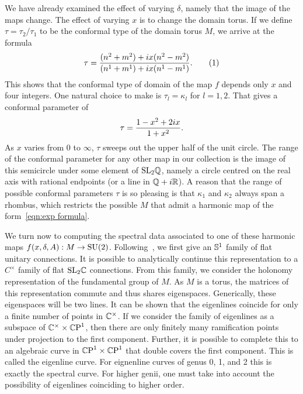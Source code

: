 \documentclass{article}
\begin{document}
We have already examined the effect of varying $\delta$, namely that the image of the maps change. The effect of varying $x$ is to change the domain torus. If we define $\tau = \tau_2/\tau_1$ to be the conformal type of the domain torus $M$, we arrive at the formula
\[
\tau
= \frac{(n^2 + m^2) + \iu x(n^2 - m^2)}
{(n^1+m^1) +\iu x(n^1-m^1)}.
\labelthis{eqn:conformal type}
\]
This shows that the conformal type of domain of the map $f$ depends only $x$ and four integers. One natural choice to make is $\tau_l=\kappa_l$ for $l=1,2$. That gives a conformal parameter of 
\[
\tau = \frac{1-x^2 + 2\iu x}{1+x^2}.
\]
As $x$ varies from $0$ to $\infty$, $\tau$ sweeps out the upper half of the unit circle. The range of the conformal parameter for any other map in our collection is the image of this semicircle under some element of $\SL_2\Q$, namely a circle centred on the real axis with rational endpoints (or a line in $\Q+\iu\R$).
A reason that the range of possible conformal parameters $\tau$ is so pleasing is that $\kappa_1$ and $\kappa_2$ always span a rhombus, which restricts the possible $M$ that admit a harmonic map of the form~\eqref{eqn:exp formula}.





We turn now to computing the spectral data associated to one of these harmonic maps $f(x,\delta,A): M \to \SU(2)$. Following~\cite{Hitchin1990}, we first give an $\S^1$ family of flat unitary connections. It is possible to analytically continue this representation to a $C^\times$ family of flat $\SL_2\C$ connections. From this family, we consider the holonomy representation of the fundamental group of $M$. As $M$ is a torus, the matrices of this representation commute and thus shares eigenspaces. Generically, these eigenspaces will be two lines. It can be shown that the eigenlines coincide for only a finite number of points in $\C^\times$. If we consider the family of eigenlines as a subspace of $\C^\times \times \CP^1$, then there are only finitely many ramification points under projection to the first component. Further, it is possible to complete this to an algebraic curve in $\CP^1 \times \CP^1$ that double covers the first component. This is called the eigenline curve. For eignenline curves of genus 0, 1, and 2 this is exactly the spectral curve. For higher genii, one must take into account the possibility of eigenlines coinciding to higher order.
\end{document}
